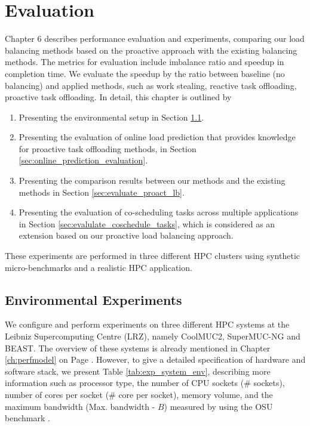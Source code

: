 \chapter{Evaluation}
\label{ch:Evaluation}
\chaptertoc
\noindent

Chapter $6$ describes performance evaluation and experiments, comparing our load balancing methods based on the proactive approach with the existing balancing methods. The metrics for evaluation include imbalance ratio and speedup in completion time. We evaluate the speedup by the ratio between baseline (no balancing) and applied methods, such as work stealing, reactive task offloading, proactive task offloading. In detail, this chapter is outlined by
\begin{enumerate}
	\item Presenting the environmental setup in Section \ref{sec:environmental_experiments}.
	\item Presenting the evaluation of online load prediction that provides knowledge for proactive task offloading methods, in Section \ref{sec:online_prediction_evaluation}.
	\item Presenting the comparison results between our methods and the existing methods in Section \ref{sec:evaluate_proact_lb}.
	\item Presenting the evaluation of co-scheduling tasks across multiple applications in Section \ref{sec:evalulate_coschedule_tasks}, which is considered as an extension based on our proactive load balancing approach.
\end{enumerate}

These experiments are performed in three different HPC clusters using synthetic micro-benchmarks and a realistic HPC application. 

\section{Environmental Experiments} \label{sec:environmental_experiments}

We configure and perform experiments on three different HPC systems at the Leibniz Supercomputing Centre (LRZ), namely CoolMUC2, SuperMUC-NG and BEAST. The overview of these systems is already mentioned in Chapter \ref{ch:perfmodel} on Page \pageref{footnote:lrz_coolmuc}. However, to give a detailed specification of hardware and software stack, we present Table \ref{tab:exp_system_env}, describing more information such as processor type, the number of CPU sockets (\# sockets), number of cores per socket (\# core per socket), memory volume, and the maximum bandwidth (Max. bandwidth - $B$) measured by using the OSU benchmark \cite{panda2021mvapich}.\\

